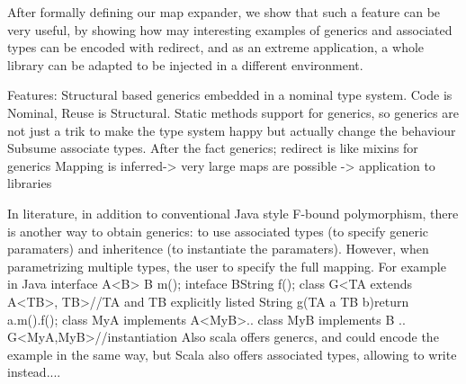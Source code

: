 After formally defining our map expander, we show that such a feature can be very useful,
by showing how 
may interesting examples of generics and associated types can be encoded with redirect, and as
an extreme application,
a whole library can be adapted to be injected in a different environment.

%  
%
%
%
%
%  
%
%
%
%
%




Features:
Structural based generics embedded in a nominal type system.
Code is Nominal, Reuse is Structural.
Static methods support for generics, so generics are not just a trik to make the type system happy but actually
change the behaviour
Subsume associate types.
After the fact generics; redirect is like mixins for generics
Mapping is inferred-> very large maps are possible -> application to libraries


In literature, in addition to conventional Java style F-bound polymorphism, there is
another way to obtain generics: to use associated types (to specify generic paramaters) and inheritence (to instantiate the paramaters).
However, when parametrizing multiple types, the user to specify the full mapping.
For example in Java
    interface A<B>{ B m(); }
    inteface B{String f();}
    class G<TA extends A<TB>, TB>{//TA and TB explicitly listed
      String g(TA a TB b){return a.m().f();}
    }
    class MyA implements A<MyB>{..}
    class MyB implements B {..}
    G<MyA,MyB>//instantiation
Also scala offers genercs, and could encode the example in the same way, but Scala
also offers associated types, allowing to write instead....

